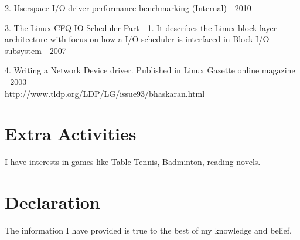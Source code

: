 \begin{resume}
2. Userspace I/O driver performance benchmarking (Internal) - 2010

3. The Linux CFQ IO-Scheduler Part - 1. It describes the Linux block layer architecture with focus on how a I/O scheduler is interfaced in Block I/O subsystem - 2007

4. Writing a Network Device driver. Published in Linux Gazette online magazine - 2003 \\
http://www.tldp.org/LDP/LG/issue93/bhaskaran.html

\section{\sc Extra Activities}
I have interests in games like Table Tennis, Badminton, reading novels. 

\section{\sc Declaration}
The information I have provided is true to the best of my knowledge and belief.

\end{resume}

